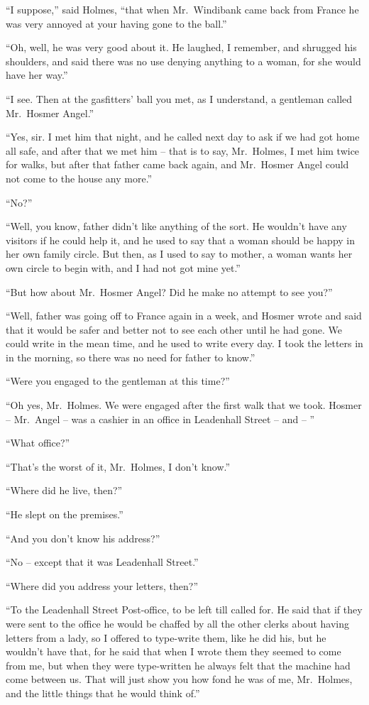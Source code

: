“I suppose,” said Holmes, “that when Mr.~Wind\-ibank came
back from France he was very annoyed at your having gone
to the ball.”

“Oh, well, he was very good about it. He laughed, I remember,
and shrugged his shoulders, and said there was no
use denying anything to a woman, for she would have her
way.”

“I see. Then at the gasfitters’ ball you met, as I understand,
a gentleman called Mr.~Hosmer Angel.”

“Yes, sir. I met him that night, and he called next day to
ask if we had got home all safe, and after that we met him --
that is to say, Mr.~Holmes, I met him twice for walks, but
after that father came back again, and Mr.~Hosmer Angel
could not come to the house any more.”

“No?”

“Well, you know, father didn’t like anything of the sort.
He wouldn’t have any visitors if he could help it, and he used
to say that a woman should be happy in her own family circle.
But then, as I used to say to mother, a woman wants her own
circle to begin with, and I had not got mine yet.”

“But how about Mr.~Hosmer Angel? Did he make no attempt
to see you?”

“Well, father was going off to France again in a week, and
Hosmer wrote and said that it would be safer and better not
to see each other until he had gone. We could write in the
mean time, and he used to write every day. I took the letters
in in the morning, so there was no need for father to
know.”

“Were you engaged to the gentleman at this time?”

“Oh yes, Mr.~Holmes. We were engaged after the first
walk that we took. Hosmer -- Mr.~Angel -- was a cashier in
an office in Leadenhall Street -- and -- ”

“What office?”

“That’s the worst of it, Mr.~Holmes, I don’t know.”

“Where did he live, then?”

“He slept on the premises.”

“And you don’t know his address?”

“No -- except that it was Leadenhall Street.”

“Where did you address your letters, then?”

“To the Leadenhall Street Post-office, to be left till called
for. He said that if they were sent to the office he would be
chaffed by all the other clerks about having letters from a
lady, so I offered to type-write them, like he did his, but he
wouldn’t have that, for he said that when I wrote them they
seemed to come from me, but when they were type-written he
always felt that the machine had come between us. That
will just show you how fond he was of me, Mr.~Holmes, and
the little things that he would think of.”

